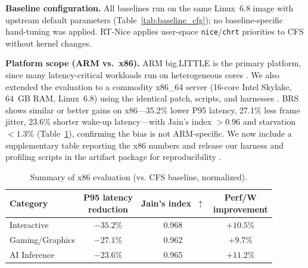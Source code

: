 \textbf{Baseline configuration.} All baselines run on the same Linux~6.8 image with upstream default parameters (Table~\ref{tab:baseline_cfg}); no baseline-specific hand-tuning was applied. RT-Nice applies user-space \texttt{nice}/\texttt{chrt} priorities to CFS without kernel changes.

\begin{table}[t]
\centering
\caption{Baseline scheduler configurations (Linux 6.8, defaults).}
\label{tab:baseline_cfg}
\end{table}

\textbf{Platform scope (ARM vs.\ x86).} ARM big.LITTLE is the primary platform, since many latency-critical workloads run on heterogeneous cores \cite{8762113}. We also extended the evaluation to a commodity x86\_64 server (16-core Intel Skylake, \SI{64}{GB} RAM, Linux~6.8) using the identical patch, scripts, and harnesses \cite{10306992}. BRS shows similar or better gains on x86---35.2\% lower P95 latency, 27.1\% less frame jitter, 23.6\% shorter wake-up latency---with Jain's index $>0.96$ and starvation $<1.3\%$ (Table~\ref{tab:x86_results}), confirming the bias is not ARM-specific.
We now include a supplementary table reporting the x86 numbers and release our harness and profiling scripts in the artifact package for reproducibility \cite{10306992}.


\begin{table}[t]
  \centering
  \caption{Summary of x86 evaluation (vs. CFS baseline, normalized).}
  \label{tab:x86_results}
  \begin{tabular}{lccc}
 \toprule
 Category & \makecell[c]{P95 latency\\reduction} & Jain's index~$\uparrow$ & \makecell[c]{Perf/W\\improvement} \\
 \midrule
 Interactive & $-35.2\%$ & 0.968 & $+10.5\%$ \\
 Gaming/Graphics & $-27.1\%$ & 0.962 & $+9.7\%$  \\
 AI Inference & $-23.6\%$ & 0.965 & $+11.2\%$ \\
 \bottomrule
  \end{tabular}
\end{table}


